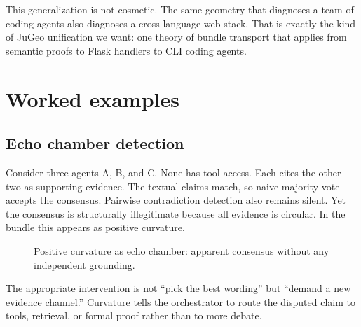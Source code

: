\documentclass[11pt]{article}
\newcommand{\Chern}{c_1}
\begin{document}
This generalization is not cosmetic.  The same geometry that diagnoses a team of
coding agents also diagnoses a cross-language web stack.  That is exactly the
kind of JuGeo unification we want: one theory of bundle transport that applies
from semantic proofs to Flask handlers to CLI coding agents.

\section{Worked examples}\label{sec:examples}

\subsection{Echo chamber detection}

Consider three agents A, B, and C.  None has tool access.  Each cites the other
two as supporting evidence.  The textual claims match, so naive majority vote
accepts the consensus.  Pairwise contradiction detection also remains silent.
Yet the consensus is structurally illegitimate because all evidence is circular.
In the bundle this appears as positive curvature.

\begin{figure}[H]
\centering
{}
\caption{Positive curvature as echo chamber: apparent consensus without any
independent grounding.}
\label{fig:echo-chamber}
\end{figure}

The appropriate intervention is not ``pick the best wording'' but ``demand a new
evidence channel.''  Curvature tells the orchestrator to route the disputed claim
to tools, retrieval, or formal proof rather than to more debate.
\end{document}

